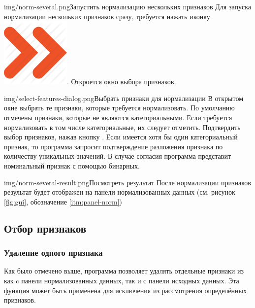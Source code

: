 \documentclass[12pt,tikz]{instruction}
\begin{document}
\begin{steps}
	\begin{ist}{img/norm-several.png}{Запустить нормализацию нескольких признаков }
		Для запуска нормализации нескольких признаков сразу, требуется нажать иконку \includegraphics[scale=0.1]{img/norm_all.png}. Откроется окно выбора признаков.
	\end{ist}
	\begin{ist}{img/select-features-dialog.png}{Выбрать признаки для нормализации}
		В открытом окне выбрать те признаки, которые требуется нормализовать. По умолчанию отмечены признаки, которые не являются категориальными. Если требуется нормализовать в том числе категориальные, их следует отметить. Подтвердить выбор признаков, нажав кнопку . Если имеется хотя бы один категориальный признак, то программа запросит подтверждение разложения признака по количеству уникальных значений. В случае согласия программа представит номинальный признак с помощью бинарных.
	\end{ist}		
	\begin{ist}{img/norm-several-result.png}{Посмотреть результат}
		После нормализации признаков результат будет отображен на панели нормализованных данных (см. рисунок \ref{fig:gui}, обозначение \ref{itm:panel-norm})
	\end{ist}
		
\end{steps}



\newpage
\subsection{Отбор признаков}
\subsubsection{Удаление одного признака}
\label{subsubsec:deleteone}

Как было отмечено выше, программа позволяет удалять отдельные признаки из как c панели нормализованных данных, так и с панели исходных данных. Эта функция может быть применена для исключения из рассмотрения определённых признаков.
\end{document}
